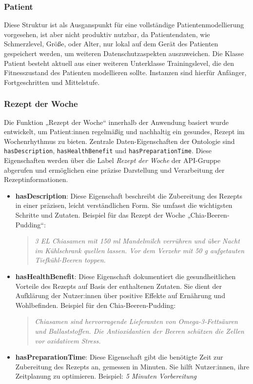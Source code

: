 \subsubsection{Patient}

Diese Struktur ist als
Ausganspunkt für eine vollständige Patientenmodellierung vorgesehen, ist aber
nicht produktiv nutzbar, da Patientendaten, wie Schmerzlevel, Größe, oder Alter, nur lokal auf dem Gerät des Patienten gespeichert werden, um weiteren Datenschutzaspekten auszuweichen. Die Klasse Patient besteht aktuell aus einer weiteren Unterklasse Trainingslevel, die den Fitnesszustand des Patienten modellieren sollte. Instanzen sind hierfür Anfänger, Fortgeschritten und Mittelstufe.

\subsubsection{Rezept der Woche}
Die Funktion „Rezept der Woche“ innerhalb der Anwendung basiert wurde entwickelt, um Patient:innen regelmäßig und nachhaltig ein gesundes, Rezept im Wochenrhythmus zu bieten.
Zentrale Daten-Eigenschaften der Ontologie sind \texttt{hasDescription}, \texttt{hasHealthBenefit} und \texttt{hasPreparationTime}. Diese Eigenschaften werden über die Label \textit{Rezept der Woche} der API-Gruppe abgerufen und ermöglichen eine präzise Darstellung und Verarbeitung der Rezeptinformationen.
\begin{itemize}
    \item \textbf{hasDescription}: Diese Eigenschaft beschreibt die Zubereitung des Rezepts in einer präzisen, leicht verständlichen Form. Sie umfasst die wichtigsten Schritte und Zutaten. Beispiel für das Rezept der Woche „Chia-Beeren-Pudding“:
    \begin{quote}
        \textit{3 EL Chiasamen mit 150 ml Mandelmilch verrühren und über Nacht im Kühlschrank quellen lassen. Vor dem Verzehr mit 50 g aufgetauten Tiefkühl-Beeren toppen.}
    \end{quote}
    
    \item \textbf{hasHealthBenefit}: Diese Eigenschaft dokumentiert die gesundheitlichen Vorteile des Rezepts auf Basis der enthaltenen Zutaten. Sie dient der Aufklärung der Nutzer:innen über positive Effekte auf Ernährung und Wohlbefinden. Beispiel für den Chia-Beeren-Pudding:
    \begin{quote}
        \textit{Chiasamen sind hervorragende Lieferanten von Omega-3-Fettsäuren und Ballaststoffen. Die Antioxidantien der Beeren schützen die Zellen vor oxidativem Stress.}
    \end{quote}
    
    \item \textbf{hasPreparationTime}: Diese Eigenschaft gibt die benötigte Zeit zur Zubereitung des Rezepts an, gemessen in Minuten. Sie hilft Nutzer:innen, ihre Zeitplanung zu optimieren. Beispiel: \textit{5 Minuten Vorbereitung}
\end{itemize}

